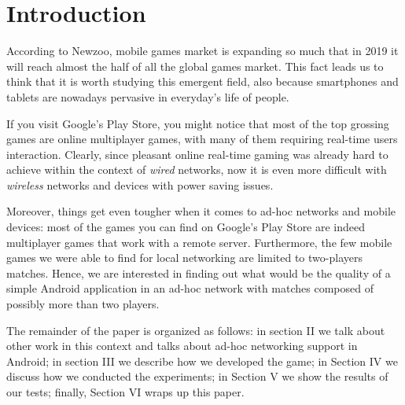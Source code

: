 \section{Introduction}
According to Newzoo, mobile games market is expanding so much that in 2019
it will reach almost the half of all the global games
market\cite{bib:newzoo}. This fact leads us to think that it is worth studying
this emergent field, also because smartphones and tablets are nowadays
pervasive in everyday's life of people.

If you visit Google's Play Store, you might notice that most of the top
grossing games are online multiplayer games, with many of them requiring
real-time users interaction. Clearly, since pleasant online real-time gaming
was already hard to achieve within the context of \textit{wired} networks, now
it is even more difficult with \textit{wireless} networks and devices with
power saving issues.

Moreover, things get even tougher when it comes to ad-hoc networks and mobile
devices: most of the games you can find on Google's Play Store are indeed
multiplayer games that work with a remote server. Furthermore, the few mobile
games we were able to find for local networking are limited to two-players
matches. Hence, we are interested in finding out what would be the quality of
a simple Android application in an ad-hoc network with matches composed of
possibly more than two players.

The remainder of the paper is organized as follows: in section II we talk about
other work in this context and talks about ad-hoc networking support in Android;
in section III we describe how we developed the game; in Section IV we discuss
how we conducted the experiments; in Section V we show the results of our tests;
finally, Section VI wraps up this paper.
